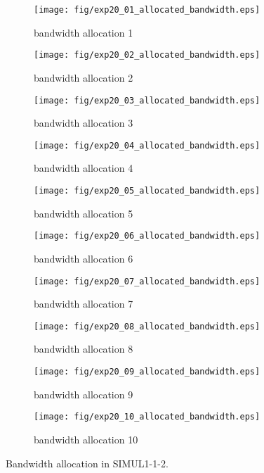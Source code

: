 	\begin{figure}
		\begin{center}
			\begin{subfigure}[b]{0.32\textwidth}
				\texttt{[image: fig/exp20\_01\_allocated\_bandwidth.eps]}
				\caption{bandwidth allocation 1}
				\label{figure:simul1_1_2_b_a}
			\end{subfigure}
			\begin{subfigure}[b]{0.32\textwidth}
				\texttt{[image: fig/exp20\_02\_allocated\_bandwidth.eps]}
				\caption{bandwidth allocation 2}
				\label{figure:simul1_1_2_b_b}
			\end{subfigure}
			\begin{subfigure}[b]{0.32\textwidth}
				\texttt{[image: fig/exp20\_03\_allocated\_bandwidth.eps]}
				\caption{bandwidth allocation 3}
				\label{figure:simul1_1_2_b_c}
			\end{subfigure}
			\begin{subfigure}[b]{0.32\textwidth}
				\texttt{[image: fig/exp20\_04\_allocated\_bandwidth.eps]}
				\caption{bandwidth allocation 4}
				\label{figure:simul1_1_2_b_d}
			\end{subfigure}
			\begin{subfigure}[b]{0.32\textwidth}
				\texttt{[image: fig/exp20\_05\_allocated\_bandwidth.eps]}
				\caption{bandwidth allocation 5}
				\label{figure:simul1_1_2_b_e}
			\end{subfigure}
			\begin{subfigure}[b]{0.32\textwidth}
				\texttt{[image: fig/exp20\_06\_allocated\_bandwidth.eps]}
				\caption{bandwidth allocation 6}
				\label{figure:simul1_1_2_b_f}
			\end{subfigure}
			\begin{subfigure}[b]{0.32\textwidth}
				\texttt{[image: fig/exp20\_07\_allocated\_bandwidth.eps]}
				\caption{bandwidth allocation 7}
				\label{figure:simul1_1_2_b_g}
			\end{subfigure}
			\begin{subfigure}[b]{0.32\textwidth}
				\texttt{[image: fig/exp20\_08\_allocated\_bandwidth.eps]}
				\caption{bandwidth allocation 8}
				\label{figure:simul1_1_2_b_h}
			\end{subfigure}
			\begin{subfigure}[b]{0.32\textwidth}
				\texttt{[image: fig/exp20\_09\_allocated\_bandwidth.eps]}
				\caption{bandwidth allocation 9}
				\label{figure:simul1_1_2_b_i}
			\end{subfigure}
			\begin{subfigure}[b]{0.32\textwidth}
				\texttt{[image: fig/exp20\_10\_allocated\_bandwidth.eps]}
				\caption{bandwidth allocation 10}
				\label{figure:simul1_1_2_b_j}
			\end{subfigure}
			\caption{Bandwidth allocation in SIMUL1-1-2.}
			\label{figure:simul1_1_2_ba}
		\end{center}
	\end{figure}

